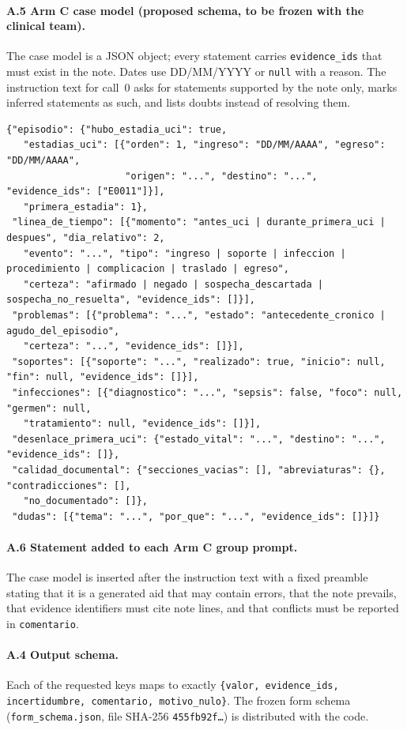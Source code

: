 \paragraph{A.5 Arm C case model (proposed schema, to be frozen with the clinical team).}\label{app:casemodel}
The case model is a JSON object; every statement carries \texttt{evidence\_ids} that must exist in the note.
Dates use DD/MM/YYYY or \texttt{null} with a reason. The instruction text for call~0 
asks for statements supported by the note only, marks inferred statements as such, and lists doubts instead of
resolving them.
\begin{lstlisting}
{"episodio": {"hubo_estadia_uci": true,
   "estadias_uci": [{"orden": 1, "ingreso": "DD/MM/AAAA", "egreso": "DD/MM/AAAA",
                     "origen": "...", "destino": "...", "evidence_ids": ["E0011"]}],
   "primera_estadia": 1},
 "linea_de_tiempo": [{"momento": "antes_uci | durante_primera_uci | despues", "dia_relativo": 2,
   "evento": "...", "tipo": "ingreso | soporte | infeccion | procedimiento | complicacion | traslado | egreso",
   "certeza": "afirmado | negado | sospecha_descartada | sospecha_no_resuelta", "evidence_ids": []}],
 "problemas": [{"problema": "...", "estado": "antecedente_cronico | agudo_del_episodio",
   "certeza": "...", "evidence_ids": []}],
 "soportes": [{"soporte": "...", "realizado": true, "inicio": null, "fin": null, "evidence_ids": []}],
 "infecciones": [{"diagnostico": "...", "sepsis": false, "foco": null, "germen": null,
   "tratamiento": null, "evidence_ids": []}],
 "desenlace_primera_uci": {"estado_vital": "...", "destino": "...", "evidence_ids": []},
 "calidad_documental": {"secciones_vacias": [], "abreviaturas": {}, "contradicciones": [],
   "no_documentado": []},
 "dudas": [{"tema": "...", "por_que": "...", "evidence_ids": []}]}
\end{lstlisting}

\paragraph{A.6 Statement added to each Arm C group prompt.} The case model is inserted after the instruction
text with a fixed preamble stating that it is a generated aid that may contain errors, that the note prevails,
that evidence identifiers must cite note lines, and that conflicts must be reported in \texttt{comentario}.

\paragraph{A.4 Output schema.} Each of the requested keys maps to exactly
\texttt{\{valor, evidence\_ids, incertidumbre, comentario, motivo\_nulo\}}. The frozen form schema
(\texttt{form\_schema.json}, file SHA-256 \texttt{455fb92f\ldots}) is distributed with the code.
